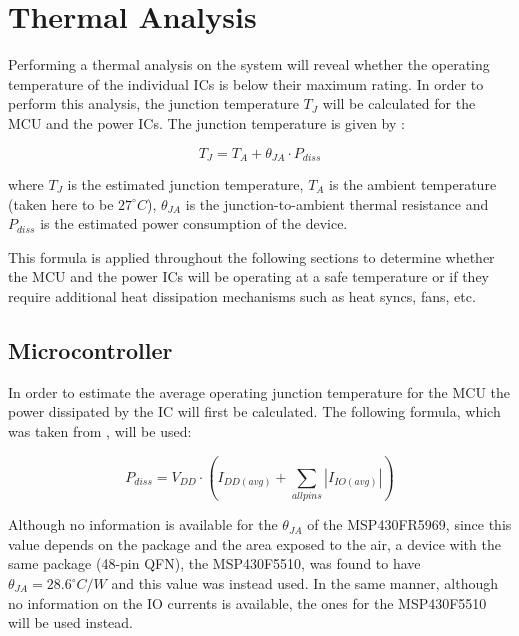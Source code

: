 \section{Thermal Analysis}
Performing a thermal analysis on the system will reveal whether the operating temperature of the individual ICs is below their maximum rating.  In order to perform this analysis, the junction temperature $T_J$ will be calculated for the MCU and the power ICs.  The junction temperature is given by \cite[419]{Jimenez2013}:

\[T_J = T_A + \theta_{JA} \cdot P_{diss}\]

where $T_J$ is the estimated junction temperature, $T_A$ is the ambient temperature (taken here to be $27^\circ C$), $\theta_{JA}$ is the junction-to-ambient thermal resistance and $P_{diss}$ is the estimated power consumption of the device. 

This formula is applied throughout the following sections to determine whether the MCU and the power ICs will be operating at a safe temperature or if they require additional heat dissipation mechanisms such as heat syncs, fans, etc.

\subsection{Microcontroller}
In order to estimate the average operating junction temperature for the MCU the power dissipated by the IC will first be calculated.  The following formula, which was taken from \cite[419]{Jimenez2013}, will be used:

\[P_{diss} = V_{DD} \cdot \left(I_{DD(avg)} + \sum_{allpins} |I_{IO(avg)}| \right)\]

Although no information is available for the $\theta_{JA}$ of the MSP430FR5969, since this value depends on the package and the area exposed to the air, a device with the same package (48-pin QFN), the MSP430F5510, was found to have $\theta_{JA} = 28.6^\circ C/W$ and this value was instead used.  In the same manner, although no information on the IO currents is available, the ones for the MSP430F5510 will be used instead.

